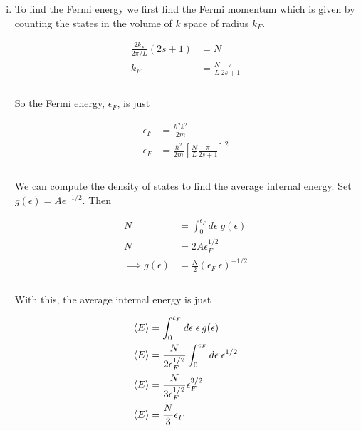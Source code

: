 \documentclass[]{article}
\begin{document}
\begin{enumerate}[i.]

\item To find the Fermi energy we first find the Fermi momentum which is given by counting the states in the volume of $k$ space of radius $k_F$.

\begin{equation}\label{eq:10}
\begin{aligned}
\frac{2 k_F}{2\pi /L} (2s+1) & = N \\
k_F & = \frac{N}{L} \frac{ \pi}{2s+1} \\
\end{aligned}
\end{equation} \\

So the Fermi energy, $\epsilon_F$, is just

\begin{equation}\label{eq:11}
\begin{aligned}
\epsilon_F & = \frac{\hbar^2 k^2}{2m} \\
\epsilon_F & = \frac{\hbar^2 }{2m}\left[   \frac{N}{L} \frac{ \pi}{2s+1}  \right]^2 \\
\end{aligned}
\end{equation} \\

We can compute the density of states to find the average internal energy. Set $g(\epsilon) = A \epsilon^{-1/2}$. Then

\begin{equation}\label{eq:12}
\begin{aligned}
N & = \int_0^{\epsilon_F} d\epsilon \; g(\epsilon) \\
N & = 2 A \epsilon_F^{1/2}  \\
\implies g(\epsilon) & = \frac{N}{2} \left(\epsilon_F \: \epsilon \right)^{-1/2} \\
\end{aligned}
\end{equation} \\

With this, the average internal energy is just

\begin{equation}\label{eq:13}
\begin{aligned}
\expval{E} & = \int_0^{\epsilon_F} d\epsilon \; \epsilon \: g(\epsilon) \\
\expval{E} & =  \frac{N}{2 \epsilon_F^{1/2}} \int_0^{\epsilon_F} d\epsilon \; \epsilon^{1/2} \\
\expval{E} & =  \frac{N}{3 \epsilon_F^{1/2}} \epsilon_F^{3/2} \\
\expval{E} & =  \frac{N}{3} \epsilon_F \\
\end{aligned}
\end{equation} \\


\end{enumerate}
\end{document}
